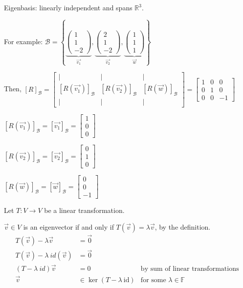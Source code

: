 \documentclass[11pt,fleqn]{book} %
\begin{document}
Eigenbasis: linearly independent and spans $\mathbb{R}^3$.

For example: $\mathcal{B} = \left\{
\underbrace{ \begin{pmatrix} 1\\1\\-2 \end{pmatrix} }_{\overrightarrow{v_1}},
\underbrace{ \begin{pmatrix} 2\\1\\-2 \end{pmatrix} }_{\overrightarrow{v_2}},
\underbrace{ \begin{pmatrix} 1\\1\\1 \end{pmatrix} }_{\overrightarrow{w}}
\right\}$

Then, $[R]_\mathcal{B} =
\begin{bmatrix} | &| &| \\ [R(\overrightarrow{v_1})]_\mathcal{B} &[R(\overrightarrow{v_2})]_\mathcal{B} &[R(\overrightarrow{w})]_\mathcal{B} \\ | &| &| \end{bmatrix} = \begin{bmatrix} 1 &0 &0 \\ 0 &1 &0 \\ 0 &0 &-1 \end{bmatrix}$

$[R(\overrightarrow{v_1})]_\mathcal{B} = [\overrightarrow{v_1}]_\mathcal{B} = \begin{bmatrix} 1\\0\\0 \end{bmatrix}$

$[R(\overrightarrow{v_2})]_\mathcal{B} = [\overrightarrow{v_2}]_\mathcal{B}=\begin{bmatrix} 0\\1\\0 \end{bmatrix}$

$[R(\overrightarrow{w})]_\mathcal{B} = [\overrightarrow{w}]_\mathcal{B}=\begin{bmatrix} 0\\0\\-1 \end{bmatrix}$

Let $T: V \to V$ be a linear transformation.

$\overrightarrow{v} \in V$  is an eigenvector if and only if $T(\overrightarrow{v}) = \lambda \overrightarrow{v}$, by the definition.
\begin{align*}
    T(\overrightarrow{v}) - \lambda \overrightarrow{v}
    &= \overrightarrow{0}
    \\
    T(\overrightarrow{v}) - \lambda ~ id(\overrightarrow{v})
    &= \overrightarrow{0}
    \\
    (T-\lambda ~ id)\overrightarrow{v}
    &= 0
    &\text{by sum of linear transformations}
    \\
    \overrightarrow{v} &\in \ker (T - \lambda ~ \mathrm{id}) &\text{for some }\lambda \in \mathbb{F}
\end{align*}
\end{document}

